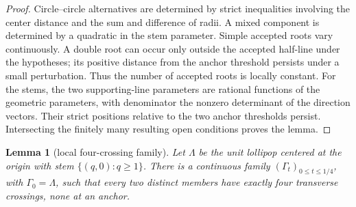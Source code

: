 \documentclass[11pt]{article}
\theoremstyle{plain}
\newtheorem{lemma}[theorem]{Lemma}
\theoremstyle{definition}
\theoremstyle{remark}
\newcommand{\1}{\mathbf 1}
\begin{document}
\begin{proof}
Circle--circle alternatives are determined by strict inequalities involving
the center distance and the sum and difference of radii.  A mixed component
is determined by a quadratic in the stem parameter.  Simple accepted roots
vary continuously.  A double root can occur only outside the accepted
half-line under the hypotheses; its positive distance from the anchor
threshold persists under a small perturbation.  Thus the number of accepted
roots is locally constant.  For the stems, the two supporting-line parameters
are rational functions of the geometric parameters, with denominator the
nonzero determinant of the direction vectors.  Their strict positions
relative to the two anchor thresholds persist.  Intersecting the finitely
many resulting open conditions proves the lemma.
\end{proof}

\begin{lemma}[local four-crossing family]\label{lem:local4}
Let $\Lambda$ be the unit lollipop centered at the origin with stem
$\{(q,0):q\geq1\}$.  There is a continuous family
$(\Gamma_t)_{0\leq t\leq1/4}$, with $\Gamma_0=\Lambda$, such that every two
distinct members have exactly four transverse crossings, none at an anchor.
\end{lemma}
\end{document}
